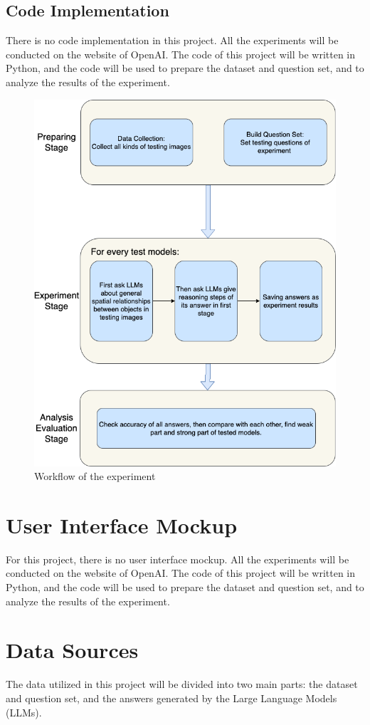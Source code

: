 \documentclass[journal,10pt]{IEEEtran}
\begin{document}
\subsection{Code Implementation}
There is no code implementation in this project. All the experiments will be conducted on the website of OpenAI. The code of this project will be written in Python, and the code will be used to prepare the dataset and question set, and to analyze the results of the experiment.

\begin{figure}[htbp]
    \centering
    \includegraphics[width=0.8\linewidth]{./pic/workflow.drawio.png}
    \caption{Workflow of the experiment}
    \label{fig:workflow}
\end{figure}

\section{User Interface Mockup}
For this project, there is no user interface mockup. All the experiments will be conducted on the website of OpenAI. The code of this project will be written in Python, and the code will be used to prepare the dataset and question set, and to analyze the results of the experiment.

\section{Data Sources}
The data utilized in this project will be divided into two main parts: the dataset and question set, and the answers generated by the Large Language Models (LLMs).
\end{document}
